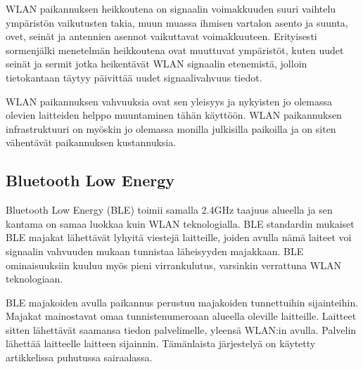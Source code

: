 WLAN paikannuksen heikkoutena on signaalin voimakkuuden suuri vaihtelu ympäristön vaikutusten takia\cite{B,G}, muun muassa ihmisen vartalon asento ja suunta, ovet, seinät ja antennien asennot vaikuttavat voimakkuuteen. Erityisesti sormenjälki menetelmän heikkoutena ovat muuttuvat ympäristöt, kuten uudet seinät ja sermit jotka heikentävät WLAN signaalin etenemistä, jolloin tietokantaan täytyy päivittää uudet signaalivahvuus tiedot.

WLAN paikannuksen vahvuuksia ovat sen yleisyys ja nykyisten jo olemassa olevien laitteiden helppo muuntaminen tähän käyttöön\cite{G}. WLAN paikannuksen infrastruktuuri on myöskin jo olemassa monilla julkisilla paikoilla ja on siten vähentävät paikannuksen kustannuksia\cite{A,B}.
\subsection{Bluetooth Low Energy}%
Bluetooth Low Energy (BLE) toimii samalla 2.4GHz taajuus alueella ja sen kantama on samaa luokkaa kuin WLAN teknologialla\cite{BLE,B}. BLE standardin mukaiset BLE majakat lähettävät lyhyitä viestejä laitteille, joiden avulla nämä laiteet voi signaalin vahvuuden mukaan tunnistaa läheisyyden majakkaan. BLE ominaisuuksiin kuuluu myös pieni virrankulutus, varsinkin verrattuna WLAN teknologiaan\cite{ibeacon}.

BLE majakoiden avulla paikannus perustuu majakoiden tunnettuihin sijainteihin. Majakat mainostavat omaa tunnistenumeroaan alueella oleville laitteille. Laitteet sitten lähettävät saamansa tiedon palvelimelle, yleensä WLAN:in avulla. Palvelin lähettää laitteelle laitteen sijainnin. Tämänlaista järjestelyä on käytetty artikkelissa\cite{ibeacon} puhutussa sairaalassa.

